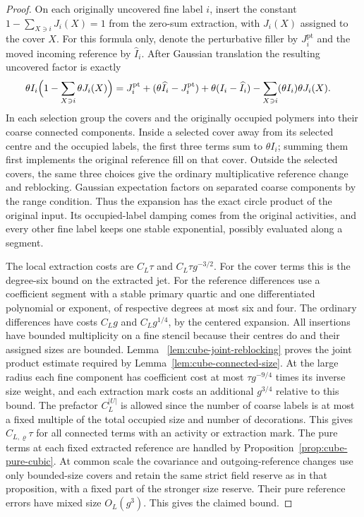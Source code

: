 \documentclass[11pt]{article}
\theoremstyle{definition}
\begin{document}
\begin{proof}
On each originally uncovered fine label \(i\), insert the
constant \(1-\sum_{X\ni i}J_i(X)=1\) from the zero-sum
extraction, with \(J_i(X)\) assigned to the cover \(X\).
For this formula only, denote the perturbative filler by
\(J_i^{\mathrm{pt}}\) and the moved incoming reference by
\(\widehat I_i\). After Gaussian translation the resulting
uncovered factor is exactly
\begin{equation}
 \begin{aligned}
 \theta I_i\Bigl(1-\sum_{X\ni i}\theta J_i(X)\Bigr)
 ={}&J_i^{\mathrm{pt}}
   +(\theta\widehat I_i-J_i^{\mathrm{pt}})
   +\theta(I_i-\widehat I_i)
   -\sum_{X\ni i}(\theta I_i)\theta J_i(X).
 \end{aligned}
\end{equation}
In each selection group the covers and the originally
occupied polymers into their coarse connected components.
Inside a selected cover away from its selected centre and
the occupied labels, the first three terms sum to
\(\theta I_i\); summing them first implements the original
reference fill on that cover. Outside the selected covers,
the same three choices give the ordinary multiplicative
reference change and reblocking. Gaussian expectation
factors on separated coarse components by the range
condition. Thus the expansion has the exact circle
product of the original input. Its occupied-label
damping comes from the original activities, and every
other fine label keeps one stable exponential, possibly
evaluated along a segment.

The local extraction costs are \(C_L\tau\) and
\(C_L\tau g^{-3/2}\). For the cover terms this is the
degree-six bound on the extracted jet. For the reference
differences use a coefficient segment with a stable
primary quartic and one differentiated polynomial or
exponent, of respective degrees at most six and four.
The ordinary differences have costs \(C_Lg\) and
\(C_Lg^{1/4}\), by the centered expansion. All insertions
have bounded multiplicity on a fine stencil because their
centres do and their assigned sizes are bounded. Lemma~
\ref{lem:cube-joint-reblocking} proves the joint product
estimate required by Lemma~\ref{lem:cube-connected-size}. At the large radius each fine component has coefficient
cost at most \(\tau g^{-9/4}\) times its inverse size weight, and each extraction mark costs an additional
\(g^{3/4}\) relative to this bound. The prefactor \(C_L^{|U|}\)
is allowed since the number of coarse labels is at most a
fixed multiple of the total occupied size and number of
decorations. This gives \(C_{L,\varrho}\tau\) for all
connected terms with an activity or extraction mark. The
pure terms at each fixed extracted reference are handled
by Proposition~\ref{prop:cube-pure-cubic}. At common scale
the covariance and outgoing-reference changes use only
bounded-size covers and retain the same strict field
reserve as in that proposition, with a fixed part of the
stronger size reserve. Their pure reference errors have
mixed size \(O_L(g^3)\). This gives the claimed bound.


\end{proof}
\end{document}
